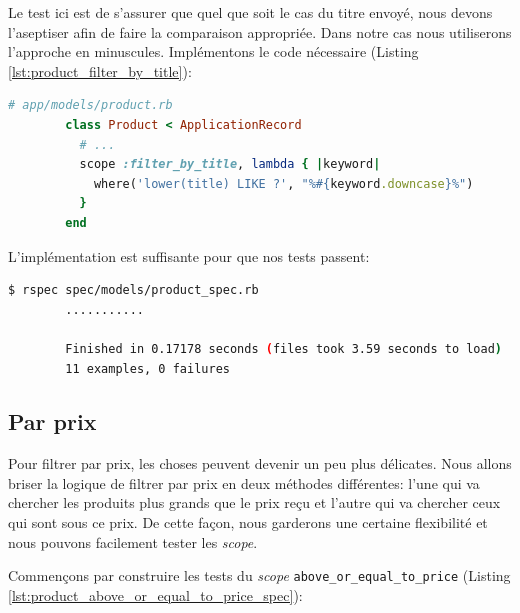 \documentclass[]{report}
\begin{document}
      Le test ici est de s'assurer que quel que soit le cas du titre envoyé, nous devons l'aseptiser afin de faire la comparaison appropriée. Dans notre cas nous utiliserons l'approche en minuscules. Implémentons le code nécessaire (Listing \ref{lst:product_filter_by_title}):

      \begin{scriptsize}
        \begin{lstlisting}[language=ruby, caption={Implémentation du filtrage des produits par titre}, label={lst:product_filter_by_title}]
        # app/models/product.rb
        class Product < ApplicationRecord
          # ...
          scope :filter_by_title, lambda { |keyword|
            where('lower(title) LIKE ?', "%#{keyword.downcase}%")
          }
        end
        \end{lstlisting}
      \end{scriptsize}

      L'implémentation est suffisante pour que nos tests passent:

      \begin{scriptsize}
        \begin{lstlisting}[language=bash]
        $ rspec spec/models/product_spec.rb
        ...........

        Finished in 0.17178 seconds (files took 3.59 seconds to load)
        11 examples, 0 failures
        \end{lstlisting}
      \end{scriptsize}

    \subsection{Par prix}

      Pour filtrer par prix, les choses peuvent devenir un peu plus délicates. Nous allons briser la logique de filtrer par prix en deux méthodes différentes: l'une qui va chercher les produits plus grands que le prix reçu et l'autre qui va chercher ceux qui sont sous ce prix. De cette façon, nous garderons une certaine flexibilité et nous pouvons facilement tester les \textit{scope}.

      Commençons par construire les tests du \textit{scope} \verb|above_or_equal_to_price| (Listing \ref{lst:product_above_or_equal_to_price_spec}):
\end{document}
